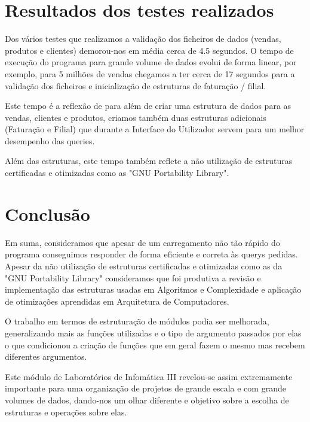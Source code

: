 \documentclass[a4paper,11pt]{report}
\begin{document}
\chapter{Resultados dos testes realizados}
\quad Dos vários testes que realizamos a validação dos ficheiros de dados (vendas, produtos e clientes) demorou-nos em média cerca de 4.5 segundos. 
O tempo de execução do programa para grande volume de dados evolui de forma linear, por exemplo, para 5 milhões de vendas chegamos a ter cerca de 17 segundos para a validação dos ficheiros e inicialização de estruturas de faturação / filial.

Este tempo é a reflexão de para além de criar uma estrutura de dados para as vendas, clientes e produtos, criamos também duas estruturas adicionais (Faturação e Filial) que durante a Interface do Utilizador servem para um melhor desempenho das queries.

Além das estruturas, este tempo também reflete a não utilização de estruturas certificadas e otimizadas como as "GNU Portability Library".




\chapter{Conclusão}
\quad Em suma, consideramos que apesar de um carregamento não tão rápido do programa conseguimos responder de forma eficiente e correta às querys pedidas. Apesar da não utilização de estruturas certificadas e otimizadas como as da "GNU Portability Library" consideramos que foi produtiva a revisão e implementação das estruturas usadas em Algoritmos e Complexidade e aplicação de otimizações aprendidas em Arquitetura de Computadores.

O trabalho em termos de estruturação de módulos podia ser melhorada, generalizando mais as funções utilizadas e o tipo de argumento passados por elas o que condicionou a criação de funções que em geral fazem o mesmo mas recebem diferentes argumentos.

Este módulo de Laboratórios de Infomática III revelou-se assim extremamente importante para uma organização de projetos de grande escala e com grande volumes de dados, dando-nos um olhar diferente e objetivo sobre a escolha de estruturas e operações sobre elas.
\end{document}
